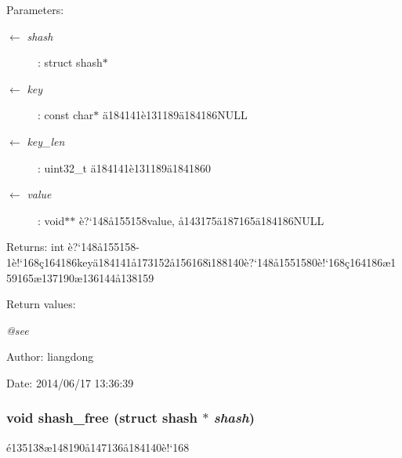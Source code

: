\begin{Desc}
\item[Parameters:]
\begin{description}
\item[\mbox{$\leftarrow$} {\em shash}]: struct shash$\ast$ \item[\mbox{$\leftarrow$} {\em key}]: const char$\ast$ \"{a}184141\`{e}131189\"{a}184186NULL \item[\mbox{$\leftarrow$} {\em key\_\-len}]: uint32\_\-t \"{a}184141\`{e}131189\"{a}1841860 \item[\mbox{$\leftarrow$} {\em value}]: void$\ast$$\ast$ \`{e}?`148\aa{}155158value, \aa{}143175\"{a}187165\"{a}184186NULL \end{description}
\end{Desc}
\begin{Desc}
\item[Returns:]int \`{e}?`148\aa{}155158-1\`{e}!`168\c{c}164186key\"{a}184141\aa{}173152\aa{}156168\"{\i}188140\`{e}?`148\aa{}1551580\`{e}!`168\c{c}164186\ae{}159165\ae{}137190\ae{}136144\aa{}138159 \end{Desc}
\begin{Desc}
\item[Return values:]
\begin{description}
\item[{\em @see}]\end{description}
\end{Desc}
\begin{Desc}
\item[Author:]liangdong \end{Desc}
\begin{Desc}
\item[Date:]2014/06/17 13:36:39 \end{Desc}
\subsubsection{\setlength{\rightskip}{0pt plus 5cm}void shash\_\-free (struct shash $\ast$ {\em shash})}\label{shash_8c_a3}


\'{e}135138\ae{}148190\aa{}147136\aa{}184140\`{e}!`168 

